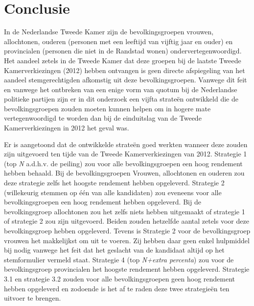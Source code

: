 \newpage
\section{Conclusie}
In de Nederlandse Tweede Kamer zijn de bevolkingsgroepen vrouwen, allochtonen, ouderen (personen met een leeftijd van vijftig jaar en ouder) en provincialen (personen die niet in de Randstad wonen) ondervertegenwoordigd. Het aandeel zetels in de Tweede Kamer dat deze groepen bij de laatste Tweede Kamerverkiezingen (2012) hebben ontvangen is geen directe afspiegeling van het aandeel stemgerechtigden afkomstig uit deze bevolkingsgroepen. Vanwege dit feit en vanwege het ontbreken van een enige vorm van quotum bij de Nederlandse politieke partijen zijn er in dit onderzoek een vijfta strate\"{e}n ontwikkeld die de bevolkingsgroepen zouden moeten kunnen helpen om in hogere mate vertegenwoordigd te worden dan bij de einduitslag van de Tweede Kamerverkiezingen in 2012 het geval was. 

Er is aangetoond dat de ontwikkelde strate\"{e}n goed werkten wanneer deze zouden zijn uitgevoerd ten tijde van de Tweede Kamerverkiezingen van 2012. Strategie 1 (top \textit{N} a.d.h.v. de peiling) zou voor alle bevolkingsgroepen een hoog rendement hebben behaald. Bij de bevolkingsgroepen Vrouwen, allochtonen en ouderen zou deze strategie zelfs het hoogste rendement hebben opgeleverd. Strategie 2 (willekeurig stemmen op één van alle kandidaten) zou eveneens voor alle bevolkingsgroepen een hoog rendement hebben opgeleverd. Bij de bevolkingsgroep allochtonen zou het zelfs niets hebben uitgemaakt of strategie 1 of strategie 2 zou zijn uitgevoerd. Beiden zouden hetzelfde aantal zetels voor deze bevolkingsgroep hebben opgeleverd. Tevens is Strategie 2 voor de bevolkingsgroep vrouwen het makkelijkst om uit te voeren. Zij hebben daar geen enkel hulpmiddel bij nodig vanwege het feit dat het geslacht van de kandidaat altijd op het stemformulier vermeld staat. Strategie 4 (top \textit{N+extra percenta}) zou voor de bevolkingsgroep provincialen het hoogste rendement hebben opgeleverd. Strategie 3.1 en strategie 3.2 zouden voor alle bevolkingsgroepen geen hoog rendement hebben opgeleverd en zodoende is het af te raden deze twee strategie\"{e}n ten uitvoer te brengen.


